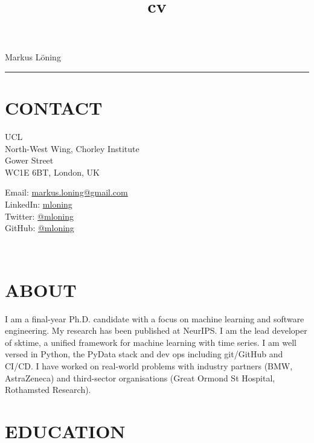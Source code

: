 \documentclass{cv}
\title{cv}
\begin{document}
{\LARGE Markus Löning}
\vspace{12pt}
\hrule

\section{CONTACT}

\begin{minipage}{.44\textwidth}
\vspace{3pt}
{\raggedright{} UCL \\
North-West Wing, Chorley Institute \\
Gower Street \\
WC1E 6BT, London, UK}
\end{minipage}
\hspace{1.25cm}
\begin{minipage}{.44\textwidth}
\vspace{3pt}
Email: \href{mailto:markus.loning@gmail.com}{markus.loning@gmail.com} \\
LinkedIn: \href{https://linkedin.com/in/mloning}{mloning} \\
Twitter: \href{https://twitter.com/mloning_}{@mloning\textunderscore} \\
GitHub: \href{https://github.com/mloning}{@mloning}
\end{minipage}
\\

\section{ABOUT}

I am a final-year Ph.D. candidate with a focus on machine learning and software engineering. My research has been published at NeurIPS. I am the lead developer of sktime, a unified framework for machine learning with time series. I am well versed in Python, the PyData stack and dev ops including git/GitHub and CI/CD. I have worked on real-world problems with industry partners (BMW, AstraZeneca) and third-sector organisations (Great Ormond St Hospital, Rothamsted Research).

\section{EDUCATION}
\end{document}
